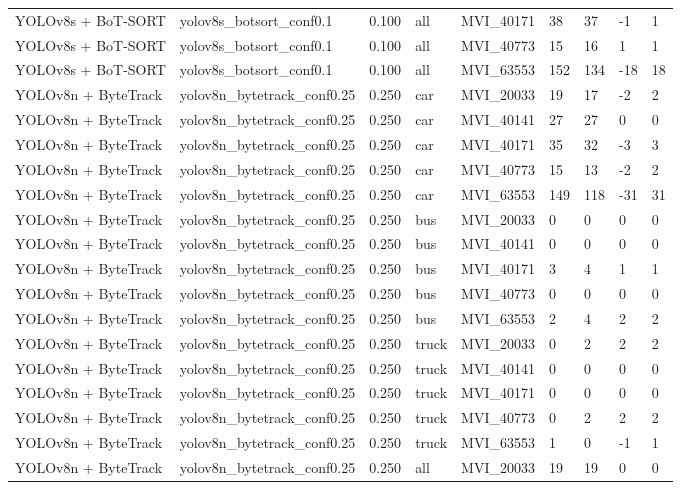 \begin{tabular}{lllllllll}
YOLOv8s + BoT-SORT & yolov8s\_botsort\_conf0.1 & 0.100 & all & MVI\_40171 & 38 & 37 & -1 & 1 \\
YOLOv8s + BoT-SORT & yolov8s\_botsort\_conf0.1 & 0.100 & all & MVI\_40773 & 15 & 16 & 1 & 1 \\
YOLOv8s + BoT-SORT & yolov8s\_botsort\_conf0.1 & 0.100 & all & MVI\_63553 & 152 & 134 & -18 & 18 \\
YOLOv8n + ByteTrack & yolov8n\_bytetrack\_conf0.25 & 0.250 & car & MVI\_20033 & 19 & 17 & -2 & 2 \\
YOLOv8n + ByteTrack & yolov8n\_bytetrack\_conf0.25 & 0.250 & car & MVI\_40141 & 27 & 27 & 0 & 0 \\
YOLOv8n + ByteTrack & yolov8n\_bytetrack\_conf0.25 & 0.250 & car & MVI\_40171 & 35 & 32 & -3 & 3 \\
YOLOv8n + ByteTrack & yolov8n\_bytetrack\_conf0.25 & 0.250 & car & MVI\_40773 & 15 & 13 & -2 & 2 \\
YOLOv8n + ByteTrack & yolov8n\_bytetrack\_conf0.25 & 0.250 & car & MVI\_63553 & 149 & 118 & -31 & 31 \\
YOLOv8n + ByteTrack & yolov8n\_bytetrack\_conf0.25 & 0.250 & bus & MVI\_20033 & 0 & 0 & 0 & 0 \\
YOLOv8n + ByteTrack & yolov8n\_bytetrack\_conf0.25 & 0.250 & bus & MVI\_40141 & 0 & 0 & 0 & 0 \\
YOLOv8n + ByteTrack & yolov8n\_bytetrack\_conf0.25 & 0.250 & bus & MVI\_40171 & 3 & 4 & 1 & 1 \\
YOLOv8n + ByteTrack & yolov8n\_bytetrack\_conf0.25 & 0.250 & bus & MVI\_40773 & 0 & 0 & 0 & 0 \\
YOLOv8n + ByteTrack & yolov8n\_bytetrack\_conf0.25 & 0.250 & bus & MVI\_63553 & 2 & 4 & 2 & 2 \\
YOLOv8n + ByteTrack & yolov8n\_bytetrack\_conf0.25 & 0.250 & truck & MVI\_20033 & 0 & 2 & 2 & 2 \\
YOLOv8n + ByteTrack & yolov8n\_bytetrack\_conf0.25 & 0.250 & truck & MVI\_40141 & 0 & 0 & 0 & 0 \\
YOLOv8n + ByteTrack & yolov8n\_bytetrack\_conf0.25 & 0.250 & truck & MVI\_40171 & 0 & 0 & 0 & 0 \\
YOLOv8n + ByteTrack & yolov8n\_bytetrack\_conf0.25 & 0.250 & truck & MVI\_40773 & 0 & 2 & 2 & 2 \\
YOLOv8n + ByteTrack & yolov8n\_bytetrack\_conf0.25 & 0.250 & truck & MVI\_63553 & 1 & 0 & -1 & 1 \\
YOLOv8n + ByteTrack & yolov8n\_bytetrack\_conf0.25 & 0.250 & all & MVI\_20033 & 19 & 19 & 0 & 0 \\

\end{tabular}

